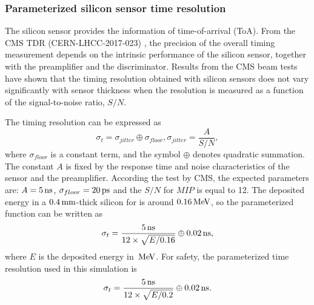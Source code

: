 \subsubsection{Parameterized silicon sensor time resolution}
\label{subsubsec:para_time}

The silicon sensor provides the information of time-of-arrival (ToA).
From the CMS TDR (CERN-LHCC-2017-023) \supercite{CERN-LHCC-2017-023},
the precision of the overall timing measurement depends on the intrinsic performance of the silicon sensor, together with the preamplifier and the discriminator.
Results from the CMS beam tests \supercite{Akchurin:2018rpm} have shown that the timing resolution obtained with silicon  sensors does not vary significantly with sensor thickness when the resolution is measured as a function of the signal-to-noise ratio, $S/N$.


The timing resolution can be expressed as
\begin{equation}
\sigma_{t} = \sigma_{jitter} \oplus \sigma_{floor},
\sigma_{jitter} = \frac{A}{S/N},
\end{equation}
where
$\sigma_{floor}$ is a constant term,
and the symbol $\oplus$ denotes quadratic summation.
The constant $A$ is fixed by the response time and noise characteristics of the sensor and the preamplifier.
According the test by CMS, the expected parameters are: $A=5\text{\,ns}$, $\sigma_{floor}=20\text{\,ps}$ and the $S/N$ for $MIP$ is equal to 12.
The deposited energy \mip in a $0.4\text{\,mm}$-thick silicon for is around $0.16\text{\,Me\kern -0.1em V}$,
so the parameterized function can be written as
\begin{equation}
\sigma_{t} = \frac{5\text{\,ns}}{12\times\sqrt{E/0.16}} \oplus 0.02\text{\,ns},
\end{equation}
where $E$ is the deposited energy in $\text{\,Me\kern -0.1em V}$. 
For safety, the parameterized time resolution used in this simulation is
\begin{equation}
\sigma_{t} = \frac{5\text{\,ns}}{12\times\sqrt{E/0.2}} \oplus 0.02\text{\,ns}.
\end{equation}








